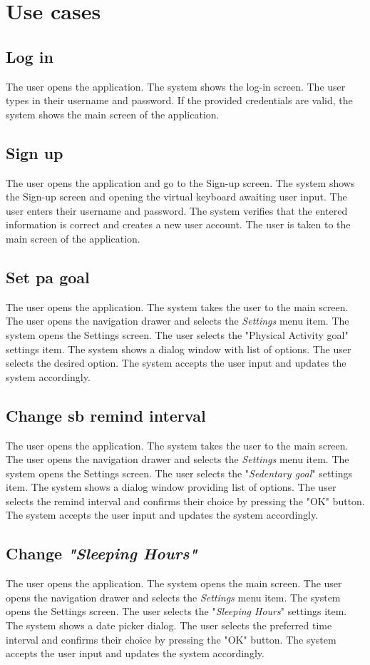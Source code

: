 \chapter{Use cases}
\label{use_cases}
\section*{Log in}
    The user opens the application. The system shows the log-in screen. The user types in their username and password. If the provided credentials are valid, the system shows the main screen of the application.
    
\section*{Sign up}
    The user opens the application and go to the Sign-up screen. The system shows the Sign-up screen and opening the virtual keyboard awaiting user input. The user enters their username and password. The system verifies that the entered information is correct and creates a new user account. The user is taken to the main screen of the application.
    
\section*{Set \gls{pa} goal}
    The user opens the application. The system takes the user to the main screen. The user opens the navigation drawer and selects the \textit{Settings} menu item. The system opens the Settings screen. The user selects the "Physical Activity goal" settings item. The system shows a dialog window with list of options. The user selects the desired option. The system accepts the user input and updates the system accordingly.

\section*{Change \gls{sb} remind interval}
    The user opens the application. The system takes the user to the main screen. The user opens the navigation drawer and selects the \textit{Settings} menu item. The system opens the Settings screen. The user selects the "\textit{Sedentary goal}" settings item. The system shows a dialog window providing list of options. The user selects the remind interval and confirms their choice by pressing the "OK" button. The system accepts the user input and updates the system accordingly. 
    
\section*{Change \textit{"Sleeping Hours"}}
    The user opens the application. The system opens the main screen. The user opens the navigation drawer and selects the \textit{Settings} menu item. The system opens the Settings screen. The user selects the "\textit{Sleeping Hours}" settings item. The system shows a date picker dialog. The user selects the preferred time interval and confirms their choice by pressing the "OK" button. The system accepts the user input and updates the system accordingly.
    
